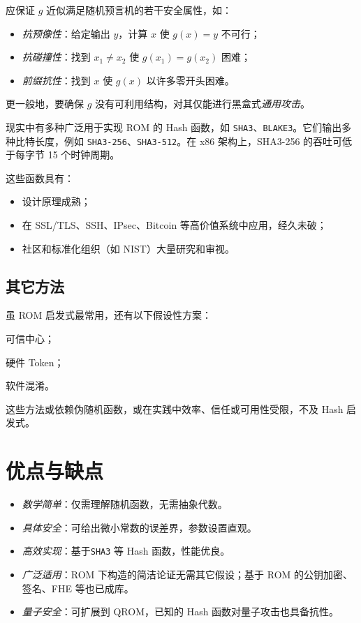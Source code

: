 \documentclass[american,singlepageview]{snargs-book-zh}
\newcommand{\CHFunction}{g}
\begin{document}
应保证 $\CHFunction$ 近似满足随机预言机的若干安全属性，如：
\begin{itemize}[noitemsep]
  \item \emph{抗预像性}：给定输出 $y$，计算 $x$ 使 $\CHFunction(x)=y$ 不可行；
  \item \emph{抗碰撞性}：找到 $x_1\neq x_2$ 使 $\CHFunction(x_1)=\CHFunction(x_2)$ 困难；
  \item \emph{前缀抗性}：找到 $x$ 使 $\CHFunction(x)$ 以许多零开头困难。
\end{itemize}
更一般地，要确保 $\CHFunction$ 没有可利用结构，对其仅能进行黑盒式\emph{通用攻击}。

现实中有多种广泛用于实现 ROM 的 Hash 函数，如 \texttt{SHA3}、\texttt{BLAKE3}。它们输出多种比特长度，例如 \texttt{SHA3-256}、\texttt{SHA3-512}。在 x86 架构上，SHA3-256 的吞吐可低于每字节 15 个时钟周期。

这些函数具有：
\begin{itemize}[noitemsep]
  \item 设计原理成熟；
  \item 在 SSL/TLS、SSH、IPsec、Bitcoin 等高价值系统中应用，经久未破；
  \item 社区和标准化组织（如 NIST）大量研究和审视。
\end{itemize}

\subsection{其它方法}
\label{section:rom-via-alternatives}

虽 ROM 启发式最常用，还有以下假设性方案：
\begin{inparaenum}[(1)]
  \item 可信中心；
  \item 硬件 Token；
  \item 软件混淆。
\end{inparaenum}
这些方法或依赖伪随机函数，或在实践中效率、信任或可用性受限，不及 Hash 启发式。

\section{优点与缺点}
\label{section:rom-benefits-and-drawbacks}

\begin{itemize}[noitemsep]
  \item \emph{数学简单}：仅需理解随机函数，无需抽象代数。
  \item \emph{具体安全}：可给出微小常数的误差界，参数设置直观。
  \item \emph{高效实现}：基于\texttt{SHA3} 等 Hash 函数，性能优良。
  \item \emph{广泛适用}：ROM 下构造的简洁论证无需其它假设；基于 ROM 的公钥加密、签名、FHE 等也已成库。
  \item \emph{量子安全}：可扩展到 QROM，已知的 Hash 函数对量子攻击也具备抗性。
\end{itemize}
\end{document}
